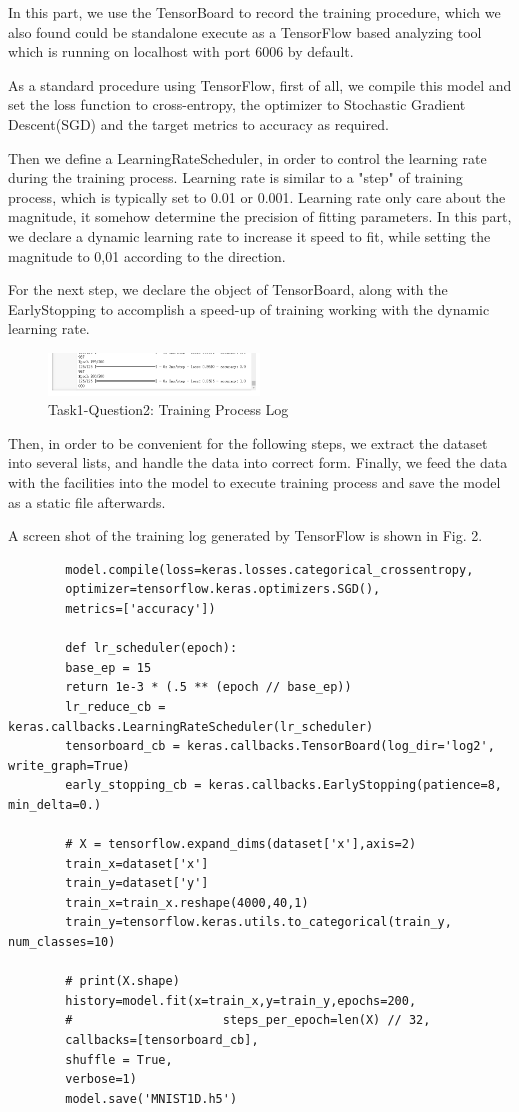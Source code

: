 \documentclass[conference]{IEEEtran}
\begin{document}
	In this part, we use the TensorBoard to record the training procedure, which we also found could be standalone execute as a TensorFlow based analyzing tool which is running on localhost with port 6006 by default.\par 
	As a standard procedure using TensorFlow, first of all, we compile this model and set the loss function to cross-entropy, the optimizer to Stochastic Gradient Descent(SGD) and the target metrics to accuracy as required. \par
	Then we define a LearningRateScheduler, in order to control the learning rate during the training process. Learning rate is similar to a "step" of training process, which is typically set to 0.01 or 0.001. Learning rate only care about the magnitude, it somehow determine the precision of fitting parameters. In this part, we declare a dynamic learning rate to increase it speed to fit, while setting the magnitude to 0,01 according to the direction.\par
	For the next step, we declare the object of TensorBoard, along with the EarlyStopping to accomplish a speed-up of training working with the dynamic learning rate.
	\begin{figure}[h] 
		\centering
		\includegraphics[width=0.5\textwidth]{T1Q2.png}
		\caption{Task1-Question2: Training Process Log} 
		\label{Fig.t1q2} 
	\end{figure}
	Then, in order to be convenient for the following steps, we extract the dataset into several lists, and handle the data into correct form. Finally, we feed the data with the facilities into the model to execute training process and save the model as a static file afterwards.\par
	A screen shot of the training log generated by TensorFlow is shown in Fig. 2.
	
	\begin{lstlisting}
		model.compile(loss=keras.losses.categorical_crossentropy,
		optimizer=tensorflow.keras.optimizers.SGD(),
		metrics=['accuracy'])
		
		def lr_scheduler(epoch):
		base_ep = 15
		return 1e-3 * (.5 ** (epoch // base_ep))
		lr_reduce_cb = keras.callbacks.LearningRateScheduler(lr_scheduler)
		tensorboard_cb = keras.callbacks.TensorBoard(log_dir='log2', write_graph=True)
		early_stopping_cb = keras.callbacks.EarlyStopping(patience=8, min_delta=0.)
		
		# X = tensorflow.expand_dims(dataset['x'],axis=2)
		train_x=dataset['x']
		train_y=dataset['y']
		train_x=train_x.reshape(4000,40,1)
		train_y=tensorflow.keras.utils.to_categorical(train_y, num_classes=10)
		
		# print(X.shape)
		history=model.fit(x=train_x,y=train_y,epochs=200,
		#                     steps_per_epoch=len(X) // 32,
		callbacks=[tensorboard_cb],                  
		shuffle = True,
		verbose=1)
		model.save('MNIST1D.h5')
	\end{lstlisting}
	
\end{document}
